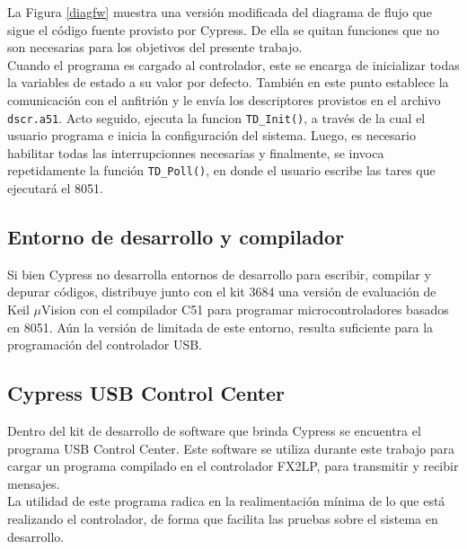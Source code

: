 	La Figura \ref{diagfw} muestra una versión modificada del diagrama de flujo que sigue el código fuente provisto por Cypress. De ella se quitan funciones que no son necesarias para los objetivos del presente trabajo.\\
	
	Cuando el programa es cargado al controlador, este se encarga de inicializar todas la variables de estado a su valor por defecto. También en este punto establece la comunicación con el anfitrión y le envía los descriptores provistos en el archivo \verb|dscr.a51|. Acto seguido, ejecuta la funcion \verb|TD_Init()|, a través de la cual el usuario programa e inicia la configuración del sistema. Luego, es necesario habilitar todas las interrupcionnes necesarias y finalmente, se invoca repetidamente la función \verb|TD_Poll()|, en donde el usuario escribe las tares que ejecutará el 8051.\\
	
	\subsection{Entorno de desarrollo y compilador}
	Si bien Cypress no desarrolla entornos de desarrollo para escribir, compilar y depurar códigos, distribuye junto con el kit 3684 una versión de evaluación de Keil $\mu$Vision con el compilador C51 para programar microcontroladores basados en 8051. Aún la versión de limitada de este entorno, resulta suficiente para la programación del controlador USB.\\
	
	\subsection{Cypress USB Control Center}
	Dentro del kit de desarrollo de software que brinda Cypress se encuentra el programa USB Control Center. Este software se utiliza durante este trabajo para cargar un programa compilado en el controlador FX2LP, para transmitir y recibir mensajes.\\
	
	La utilidad de este programa radica en la realimentación mínima de lo que está realizando el controlador, de forma que facilita las pruebas sobre el sistema en desarrollo.\\	